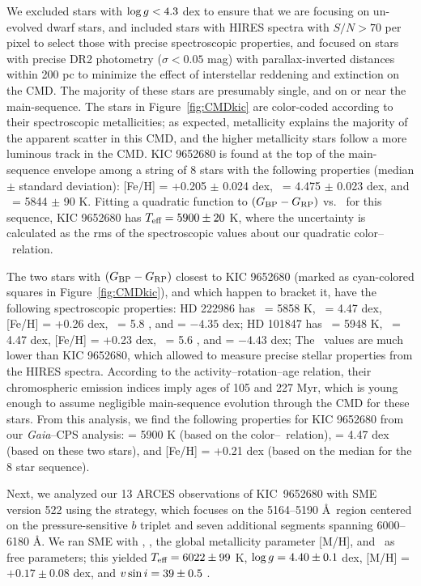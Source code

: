 We excluded stars with $\log g < 4.3$ dex to ensure 
that we are focusing on un-evolved dwarf stars, 
and included stars with HIRES spectra with $S/N > 70$ per pixel
to select those with precise spectroscopic properties,
and focused on stars with precise DR2 photometry 
($\sigma < 0.05$ mag)
with parallax-inverted distances within 200 pc 
to minimize the effect of interstellar reddening and extinction 
on the CMD.
The majority of these stars are presumably single, 
and on or near the main-sequence. 
The stars in Figure~\ref{fig:CMDkic} are color-coded according to their spectroscopic metallicities; as expected, metallicity explains the majority of the 
apparent scatter in this CMD, 
and the higher metallicity stars follow a 
more luminous track in the CMD. 
KIC 9652680 is found at the top of
the main-sequence envelope 
among a string of 8 stars with the following properties 
(median $\pm$ standard deviation): 
[Fe/H] = +0.205 $\pm$ 0.024 dex, 
\logg\ =  4.475 $\pm$ 0.023 dex, 
and 
\teff\ =  5844 $\pm$ 90 K. 
Fitting a quadratic function to 
$(G_{\rm BP} - G_{\rm RP})$ vs. \teff\ for this sequence, 
KIC 9652680 has $T_{\mbox{\scriptsize eff}} = 5900 \pm 20$ K,
where the uncertainty is calculated as the 
rms of the spectroscopic values about our 
quadratic color--\teff\ relation.

The two stars with $(G_{\rm BP} - G_{\rm RP})$ closest to KIC 9652680
(marked as cyan-colored squares in Figure~\ref{fig:CMDkic}),
and which happen to bracket it, have the following spectroscopic properties: 
HD 222986 has \teff\ = 5858 K, \logg\ = 4.47 dex, 
[Fe/H] = +0.26 dex, \vsini\ = 5.8 \kms, 
and \logrprime = $-4.35$ dex; 
HD 101847 has \teff\ = 5948 K, \logg\ = 4.47 dex, 
[Fe/H] = +0.23 dex, \vsini\ = 5.6 \kms, 
and \logrprime = $-4.43$ dex; 
The \vsini\ values are much lower than KIC 9652680, 
which allowed \citet{Brewer2016} to measure 
precise stellar properties from the HIRES spectra.
According to the \citet{Mamajek2008} 
activity--rotation--age relation, 
their chromospheric emission indices 
imply ages of 105 and 227 Myr, 
which is young enough to assume negligible 
main-sequence evolution through the CMD for these stars.
From this analysis, 
we find the following properties 
for KIC 9652680 from our 
\textit{Gaia}--CPS analysis: 
\teff = 5900 K (based on the color--\teff\ relation), 
\logg = 4.47 dex (based on these two stars), and 
[Fe/H] = +0.21 dex (based on the median for the 8 star sequence).

Next, we analyzed our 13 ARCES observations of KIC~9652680 with SME version 522
using the \citet{Valenti2005} strategy, 
which focuses on 
the 5164--5190 \AA\ region centered on the 
pressure-sensitive  $b$ triplet 
and seven additional segments spanning 6000--6180 \AA. 
We 
ran SME with \teff, \logg, the global metallicity parameter [M/H], 
and \vsini\ as free parameters; 
this yielded 
$T_{\mbox{\scriptsize eff}} = 6022 \pm 99$ K, %
$\log g = 4.40 \pm 0.1$ dex, %
[M/H] = $+0.17 \pm 0.08$ dex, and %
$v \sin i = 39 \pm 0.5$ \kms. %

